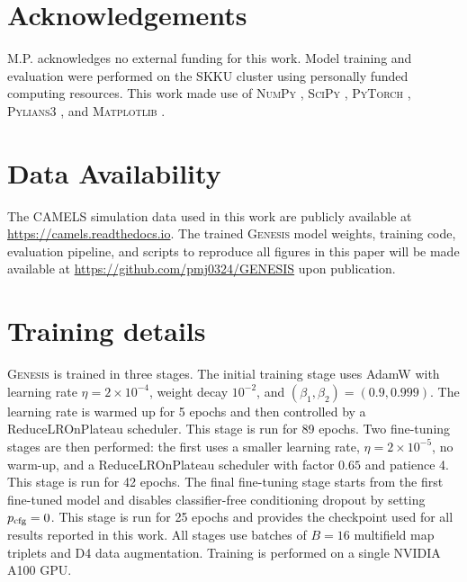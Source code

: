 \documentclass{article}
\begin{document}
\section*{Acknowledgements}

M.P. acknowledges no external funding for this work.
Model training and evaluation were performed on the SKKU cluster using
personally funded computing resources.
This work made use of
\textsc{NumPy} \citep{Harris2020},
\textsc{SciPy} \citep{Virtanen2020},
\textsc{PyTorch} \citep{Paszke2019},
\textsc{Pylians3} \citep{Villaescusa2018Pylians},
and \textsc{Matplotlib} \citep{Hunter2007}.

\section*{Data Availability}

The CAMELS simulation data used in this work are publicly available at
\url{https://camels.readthedocs.io}.
The trained \textsc{Genesis} model weights, training code, evaluation
pipeline, and scripts to reproduce all figures in this paper will be
made available at \url{https://github.com/pmj0324/GENESIS} upon
publication.




\appendix

\section{Training details}
\label{app:training_details}

\textsc{Genesis} is trained in three stages. The initial training stage
uses AdamW \citep{Loshchilov2019} with learning rate
$\eta=2\times10^{-4}$, weight decay $10^{-2}$, and
$(\beta_1,\beta_2)=(0.9,0.999)$. The learning rate is warmed up for
5 epochs and then controlled by a ReduceLROnPlateau scheduler. This
stage is run for 89 epochs. Two fine-tuning stages are then performed:
the first uses a smaller learning rate, $\eta=2\times10^{-5}$, no
warm-up, and a ReduceLROnPlateau scheduler with factor $0.65$ and
patience 4. This stage is run for 42 epochs. The final fine-tuning
stage starts from the first fine-tuned model and disables
classifier-free conditioning dropout by setting $p_{\rm cfg}=0$. This
stage is run for 25 epochs and provides the checkpoint used for all
results reported in this work. All stages use batches of $B=16$
multifield map triplets and D4 data augmentation. Training is performed
on a single NVIDIA A100 GPU.
\end{document}
